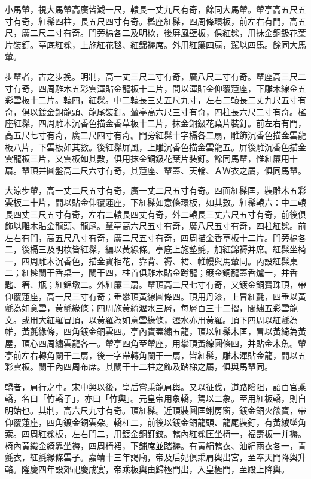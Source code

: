 小馬輦，視大馬輦高廣皆減一尺，轅長一丈九尺有奇，餘同大馬輦。輦亭高五尺五寸有奇，紅髹四柱，長五尺四寸有奇。檻座紅髹，四周條環板，前左右有門，高五尺，廣二尺二寸有奇。門旁槅各二及明栨，後屏風壁板，俱紅髹，用抹金銅鈒花葉片裝釘。亭底紅髹，上施紅花毯、紅錦褥席。外用紅簾四扇，駕以四馬。餘同大馬輦。

步輦者，古之步挽。明制，高一丈三尺二寸有奇，廣八尺二寸有奇。輦座高三尺二寸有奇，四周雕木五彩雲渾貼金龍板十二片，間以渾貼金仰覆蓮座，下雕木線金五彩雲板十二片。轅四，紅髹。中二轅長三丈五尺九寸，左右二轅長二丈九尺五寸有奇，俱以鍍金銅龍頭、龍尾裝釘。輦亭高六尺三寸有奇，四柱長六尺二寸有奇。檻座紅髹，四周雕木沉香色描金香草板十二片，抹金銅鈒花葉片裝釘。前左右有門，高五尺七寸有奇，廣二尺四寸有奇。門旁紅髹十字槅各二扇，雕飾沉香色描金雲龍板八片，下雲板如其數。後紅髹屏風，上雕沉香色描金雲龍五。屏後雕沉香色描金雲龍板三片，又雲板如其數，俱用抹金銅鈒花葉片裝釘。餘同馬輦，惟紅簾用十扇。輦頂并圓盤高二尺六寸有奇，其蓮座、輦蓋、天輪、ＡＷ衣之屬，俱同馬輦。

大涼步輦，高一丈二尺五寸有奇，廣一丈二尺五寸有奇。四面紅髹匡，裝雕木五彩雲板二十片，間以貼金仰覆蓮座，下紅髹如意條環板，如其數。紅髹轅六：中二轅長四丈三尺五寸有奇，左右二轅長四丈有奇，外二轅長三丈六尺五寸有奇，前後俱飾以雕木貼金龍頭、龍尾。輦亭高六尺五寸有奇，廣八尺五寸有奇，四柱紅髹。前左右有門，高五尺八寸有奇，廣二尺五寸有奇，四周描金香草板十二片。門旁槅各二，後槅三及明栨皆紅髹，編以黃線條。亭底上施墊氈，加紅錦褥并席。紅髹坐椅一，四周雕木沉香色，描金寶相花，靠背、褥、裙、帷幔與馬輦同。內設紅髹桌二；紅髹闌干香桌一，闌干四，柱首俱雕木貼金蹲龍；鍍金銅龍蓋香爐一，并香匙、箸、瓶；紅錦墩二。外紅簾三扇。輦頂高二尺七寸有奇，又鍍金銅寶珠頂，帶仰覆蓮座，高一尺三寸有奇；垂攀頂黃線圓條四。頂用丹漆，上冒紅氈，四垂以黃氈為如意雲，黃氈緣條；四周施黃綺瀝水三層，每層百三十二摺，間繡五彩雲龍文。或用大紅羅冒頂，以黃羅為如意雲緣條，瀝水亦用黃羅。頂下四周以紅氈為帷，黃氈緣條，四角鍍金銅雲四。亭內寶蓋繡五龍，頂以紅髹木匡，冒以黃綺為黃屋，頂心四周繡雲龍各一。輦亭四角至輦座，用攀頂黃線圓條四，并貼金木魚。輦亭前左右轉角闌干二扇，後一字帶轉角闌干一扇，皆紅髹，雕木渾貼金龍，間以五彩雲板。闌干內四周布席。其闌干十二柱之飾及踏梯之屬，俱與馬輦同。

轎者，肩行之車。宋中興以後，皇后嘗乘龍肩輿。又以征伐，道路險阻，詔百官乘轎，名曰「竹轎子」，亦曰「竹輿」。元皇帝用象轎，駕以二象。至用紅板轎，則自明始也。其制，高六尺九寸有奇。頂紅髹。近頂裝圓匡蜊房窗，鍍金銅火燄寶，帶仰覆蓮座，四角鍍金銅雲朵。轎杠二，前後以鍍金銅龍頭、龍尾裝釘，有黃絨墜角索。四周紅髹板，左右門二，用鍍金銅釘鉸。轎內紅髹匡坐椅一，福壽板一并褥。椅內黃織金綺靠坐褥，四周椅裙，下鋪席並踏褥。有黃絹轎衣、油絹雨衣各一，青氈衣，紅氈緣條雲子。嘉靖十三年謁廟，帝及后妃俱乘肩輿出宮，至奉天門降輿升輅。隆慶四年設郊祀慶成宴，帝乘板輿由歸極門出，入皇極門，至殿上降輿。

